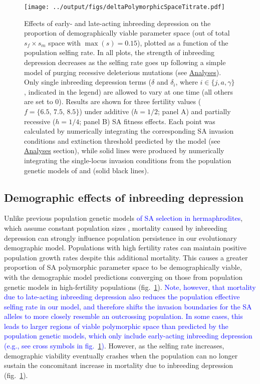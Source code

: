 \documentclass[11pt]{article}
\begin{document}
 \begin{figure}[htbp]
 \centering
 \texttt{[image: ../output/figs/deltaPolymorphicSpaceTitrate.pdf]}
 \caption{\footnotesize{Effects of early- and late-acting inbreeding depression on the proportion of demographically viable parameter space (out of total $s_f \times s_m$ space with $\max(s) = 0.15$), plotted as a function of the population selfing rate. In all plots, the strength of inbreeding depression decreases as the selfing rate goes up following a simple model of purging recessive deleterious mutations (see \hyperref[subsec:analyses]{Analyses}). Only single inbreeding depression terms ($\delta$ and $\delta_i$, where $i \in \{j,a,\gamma\}$, indicated in the legend) are allowed to vary at one time (all others are set to $0$). Results are shown for three fertility values ($f = \{6.5,\,7.5,\,8.5\}$) under additive ($h = 1/2$; panel A) and partially recessive ($h = 1/4$; panel B) SA fitness effects. Each point was calculated by numerically integrating the corresponding SA invasion conditions and extinction threshold predicted by the model (see \hyperref[subsec:analyses]{Analyses} section), while solid lines were produced by numerically integrating the single-locus invasion conditions from the population genetic models of \citet{JordanConnallon2014} and \citet{Olito2017} (solid black lines).}} 
 \label{fig:deltaPolySpace}
 \end{figure}


\subsection*{Demographic effects of inbreeding depression} \label{subsec:InbreedEffects}

Unlike previous population genetic models \textcolor{blue}{of SA selection in hermaphrodites}, which assume constant population sizes \citep{JordanConnallon2014,Olito2017}, mortality caused by inbreeding depression can strongly influence population persistence in our evolutionary demographic model. Populations with high fertility rates can maintain positive population growth rates despite this additional mortality. This causes a greater proportion of SA polymorphic parameter space to be demographically viable, with the demographic model predictions converging on those from population genetic models in high-fertility populations (fig.~\ref{fig:deltaPolySpace}).  \textcolor{blue}{Note, however, that mortality due to late-acting inbreeding depression also reduces the population effective selfing rate in our model, and therefore shifts the invasion boundaries for the SA alleles to more closely resemble an outcrossing population. In some cases, this leads to larger regions of viable polymorphic space than predicted by the population genetic models, which only include early-acting inbreeding depression (e.g., see cross symbols in fig.~\ref{fig:deltaPolySpace})}. However, as the selfing rate increases, demographic viability eventually crashes when the population can no longer sustain the concomitant increase in mortality due to inbreeding depression (fig.~\ref{fig:deltaPolySpace}).
\end{document}
